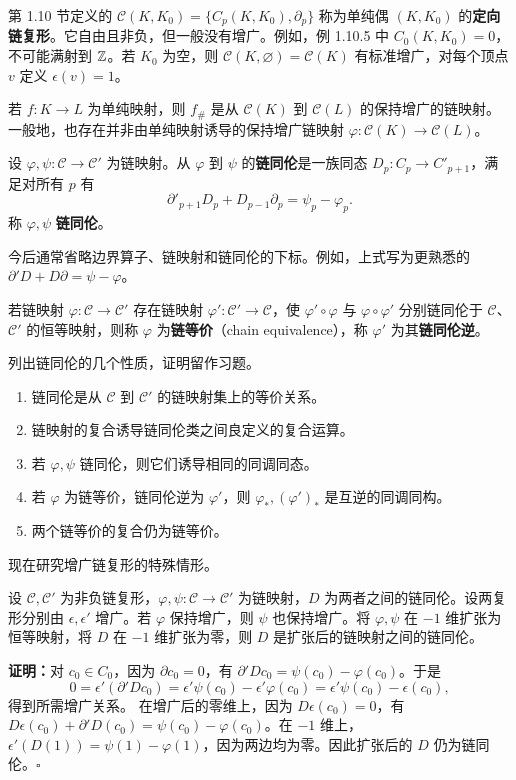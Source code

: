 第 1.10 节定义的 $\mathcal C(K,K_0)=\{C_p(K,K_0),\partial_p\}$ 称为单纯偶 $(K,K_0)$ 的\textbf{定向链复形}。它自由且非负，但一般没有增广。例如，例 1.10.5 中 $C_0(K,K_0)=0$，不可能满射到 $\mathbb{Z}$。若 $K_0$ 为空，则 $\mathcal C(K,\varnothing)=\mathcal C(K)$ 有标准增广，对每个顶点 $v$ 定义 $\epsilon(v)=1$。

若 $f:K\to L$ 为单纯映射，则 $f_\#$ 是从 $\mathcal C(K)$ 到 $\mathcal C(L)$ 的保持增广的链映射。一般地，也存在并非由单纯映射诱导的保持增广链映射 $\varphi:\mathcal C(K)\to\mathcal C(L)$。

设 $\varphi,\psi:\mathcal C\to\mathcal C'$ 为链映射。从 $\varphi$ 到 $\psi$ 的\textbf{链同伦}是一族同态 $D_p:C_p\to C'_{p+1}$，满足对所有 $p$ 有
\[
\partial'_{p+1}D_p+D_{p-1}\partial_p=\psi_p-\varphi_p.
\]
称 $\varphi,\psi$ \textbf{链同伦}。

今后通常省略边界算子、链映射和链同伦的下标。例如，上式写为更熟悉的 $\partial'D+D\partial=\psi-\varphi$。

若链映射 $\varphi:\mathcal C\to\mathcal C'$ 存在链映射 $\varphi':\mathcal C'\to\mathcal C$，使 $\varphi'\circ\varphi$ 与 $\varphi\circ\varphi'$ 分别链同伦于 $\mathcal C$、$\mathcal C'$ 的恒等映射，则称 $\varphi$ 为\textbf{链等价}（chain equivalence），称 $\varphi'$ 为其\textbf{链同伦逆}。

列出链同伦的几个性质，证明留作习题。
\begin{enumerate}[label=(\arabic*)]
\item 链同伦是从 $\mathcal C$ 到 $\mathcal C'$ 的链映射集上的等价关系。
\item 链映射的复合诱导链同伦类之间良定义的复合运算。
\item 若 $\varphi,\psi$ 链同伦，则它们诱导相同的同调同态。
\item 若 $\varphi$ 为链等价，链同伦逆为 $\varphi'$，则 $\varphi_*,(\varphi')_*$ 是互逆的同调同构。
\item 两个链等价的复合仍为链等价。
\end{enumerate}
现在研究增广链复形的特殊情形。

设 $\mathcal C,\mathcal C'$ 为非负链复形，$\varphi,\psi:\mathcal C\to\mathcal C'$ 为链映射，$D$ 为两者之间的链同伦。设两复形分别由 $\epsilon,\epsilon'$ 增广。若 $\varphi$ 保持增广，则 $\psi$ 也保持增广。将 $\varphi,\psi$ 在 $-1$ 维扩张为恒等映射，将 $D$ 在 $-1$ 维扩张为零，则 $D$ 是扩张后的链映射之间的链同伦。

\noindent\textbf{证明：}对 $c_0\in C_0$，因为 $\partial c_0=0$，有 $\partial'Dc_0=\psi(c_0)-\varphi(c_0)$。于是
\[
0=\epsilon'(\partial'Dc_0)=\epsilon'\psi(c_0)-\epsilon'\varphi(c_0)
=\epsilon'\psi(c_0)-\epsilon(c_0),
\]
得到所需增广关系。
在增广后的零维上，因为 $D\epsilon(c_0)=0$，有 $D\epsilon(c_0)+\partial'D(c_0)=\psi(c_0)-\varphi(c_0)$。在 $-1$ 维上，$\epsilon'(D(1))=\psi(1)-\varphi(1)$，因为两边均为零。因此扩张后的 $D$ 仍为链同伦。\hfill$\square$

